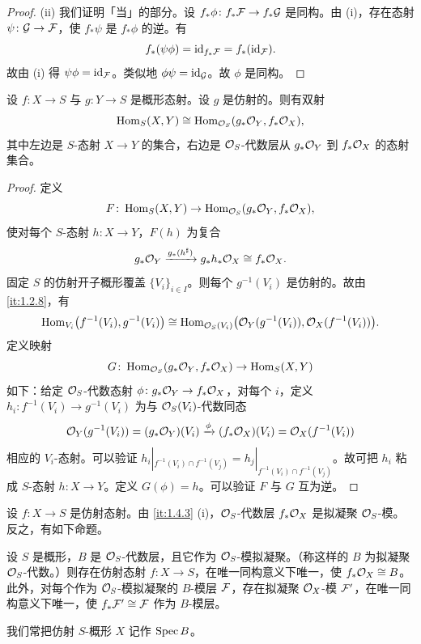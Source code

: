 \begin{proof}
(ii) 我们证明「当」的部分。设 $f_*\phi\colon f_*\mathcal{F}\to f_*\mathcal{G}$ 是同构。由 (i)，存在态射 $\psi\colon\mathcal{G}\to\mathcal{F}$，使 $f_*\psi$ 是 $f_*\phi$ 的逆。有
\[
f_*(\psi\phi)=\operatorname{id}_{f_*\mathcal{F}}=f_*(\operatorname{id}_{\mathcal{F}}).
\]
故由 (i) 得 $\psi\phi=\operatorname{id}_{\mathcal{F}}$。类似地 $\phi\psi=\operatorname{id}_{\mathcal{G}}$。故 $\phi$ 是同构。
\end{proof}

\begin{proposition}\label{it:1.4.11}
设 $f\colon X\to S$ 与 $g\colon Y\to S$ 是概形态射。设 $g$ 是仿射的。则有双射
\[
\operatorname{Hom}_S(X,Y)\cong\operatorname{Hom}_{\mathcal{O}_S}(g_*\mathcal{O}_Y,f_*\mathcal{O}_X),
\]
其中左边是 $S$-态射 $X\to Y$ 的集合，右边是 $\mathcal{O}_S$-代数层从 $g_*\mathcal{O}_Y$ 到 $f_*\mathcal{O}_X$ 的态射集合。
\end{proposition}

\begin{proof}
定义
\[
F\colon\operatorname{Hom}_S(X,Y)\to\operatorname{Hom}_{\mathcal{O}_S}(g_*\mathcal{O}_Y,f_*\mathcal{O}_X),
\]
使对每个 $S$-态射 $h\colon X\to Y$，$F(h)$ 为复合
\[
g_*\mathcal{O}_Y\xrightarrow{g_*(h^\sharp)}g_*h_*\mathcal{O}_X\cong f_*\mathcal{O}_X.
\]
固定 $S$ 的仿射开子概形覆盖 $\{V_i\}_{i\in I}$。则每个 $g^{-1}(V_i)$ 是仿射的。故由 \ref{it:1.2.8}，有
\[
\operatorname{Hom}_{V_i}\bigl(f^{-1}(V_i),g^{-1}(V_i)\bigr)\cong\operatorname{Hom}_{\mathcal{O}_S(V_i)}\bigl(\mathcal{O}_Y(g^{-1}(V_i)),\mathcal{O}_X(f^{-1}(V_i))\bigr).
\]
定义映射
\[
G\colon\operatorname{Hom}_{\mathcal{O}_S}(g_*\mathcal{O}_Y,f_*\mathcal{O}_X)\to\operatorname{Hom}_S(X,Y)
\]
如下：给定 $\mathcal{O}_S$-代数态射 $\phi\colon g_*\mathcal{O}_Y\to f_*\mathcal{O}_X$，对每个 $i$，定义 $h_i\colon f^{-1}(V_i)\to g^{-1}(V_i)$ 为与 $\mathcal{O}_S(V_i)$-代数同态
\[
\mathcal{O}_Y(g^{-1}(V_i))=(g_*\mathcal{O}_Y)(V_i)\xrightarrow{\phi}(f_*\mathcal{O}_X)(V_i)=\mathcal{O}_X(f^{-1}(V_i))
\]
相应的 $V_i$-态射。可以验证 $h_i|_{f^{-1}(V_i)\cap f^{-1}(V_j)}=h_j|_{f^{-1}(V_i)\cap f^{-1}(V_j)}$。故可把 $h_i$ 粘成 $S$-态射 $h\colon X\to Y$。定义 $G(\phi)=h$。可以验证 $F$ 与 $G$ 互为逆。
\end{proof}

设 $f\colon X\to S$ 是仿射态射。由 \ref{it:1.4.3} (i)，$\mathcal{O}_S$-代数层 $f_*\mathcal{O}_X$ 是拟凝聚 $\mathcal{O}_S$-模。反之，有如下命题。

\begin{proposition}\label{it:1.4.12}
设 $S$ 是概形，$B$ 是 $\mathcal{O}_S$-代数层，且它作为 $\mathcal{O}_S$-模拟凝聚。（称这样的 $B$ 为拟凝聚 $\mathcal{O}_S$-代数。）则存在仿射态射 $f\colon X\to S$，在唯一同构意义下唯一，使 $f_*\mathcal{O}_X\cong B$。此外，对每个作为 $\mathcal{O}_S$-模拟凝聚的 $B$-模层 $\mathcal{F}$，存在拟凝聚 $\mathcal{O}_X$-模 $\mathcal{F}'$，在唯一同构意义下唯一，使 $f_*\mathcal{F}'\cong\mathcal{F}$ 作为 $B$-模层。
\end{proposition}

我们常把仿射 $S$-概形 $X$ 记作 $\operatorname{Spec} B$。

